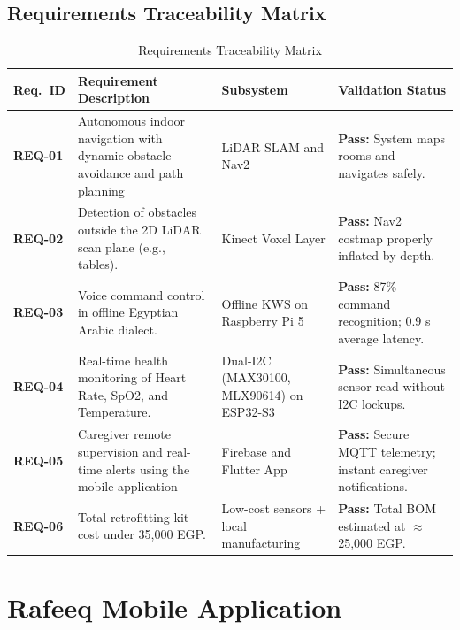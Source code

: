 \documentclass[12pt,a4paper]{report}
\renewcommand{\arraystretch}{1.45}
\renewcommand{\arraystretch}{1.3}
\begin{document}
\section{Requirements Traceability Matrix}
\label{sec:traceability}

\begin{table}[H]
\centering
\caption{Requirements Traceability Matrix}
\label{tab:traceability}
{\renewcommand{\arraystretch}{1.4}
\begin{tabularx}{\textwidth}{@{}p{1.7cm}Xp{2.3cm}X@{}}
\toprule
\textbf{Req.\ ID} & \textbf{Requirement Description} & \textbf{Subsystem} & \textbf{Validation Status} \\
\midrule
\textbf{REQ-01} & Autonomous indoor navigation with dynamic obstacle avoidance and path planning & LiDAR SLAM and Nav2 & \textbf{Pass:} System maps rooms and navigates safely. \\
\midrule
\textbf{REQ-02} & Detection of obstacles outside the 2D LiDAR scan plane (e.g., tables). & Kinect Voxel Layer & \textbf{Pass:} Nav2 costmap properly inflated by depth. \\
\midrule
\textbf{REQ-03} & Voice command control in offline Egyptian Arabic dialect. & Offline KWS  on Raspberry Pi 5 \ & \textbf{Pass:} 87\% command recognition; 0.9 s average latency. \\
\midrule
\textbf{REQ-04} & Real-time health monitoring of Heart Rate, SpO2, and Temperature. & Dual-I2C (MAX30100, MLX90614) on ESP32-S3 & \textbf{Pass:} Simultaneous sensor read without I2C lockups. \\
\midrule
\textbf{REQ-05} & Caregiver remote supervision and real-time alerts using the mobile application & Firebase and Flutter App & \textbf{Pass:} Secure MQTT telemetry; instant caregiver notifications. \\
\midrule
\textbf{REQ-06} & Total retrofitting kit cost under 35,000 EGP. & Low-cost sensors + local manufacturing & \textbf{Pass:} Total BOM estimated at $\approx$25,000 EGP. \\
\bottomrule
\end{tabularx}}
\end{table}
\chapter{Rafeeq Mobile Application}
\label{chap:mobile}
\end{document}
